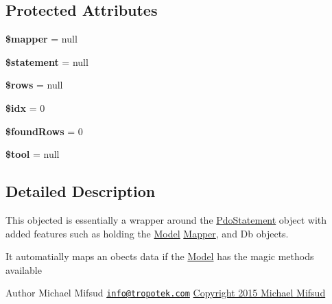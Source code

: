 \subsection*{Protected Attributes}
\begin{DoxyCompactItemize}
\item 
\hypertarget{classTk_1_1Db_1_1ArrayObject_af34f0e32e8e258554cee2574f05f71cd}{{\bfseries \$mapper} = null}\label{classTk_1_1Db_1_1ArrayObject_af34f0e32e8e258554cee2574f05f71cd}

\item 
\hypertarget{classTk_1_1Db_1_1ArrayObject_ae0e5c4143c950ee15d4d71a215089daa}{{\bfseries \$statement} = null}\label{classTk_1_1Db_1_1ArrayObject_ae0e5c4143c950ee15d4d71a215089daa}

\item 
\hypertarget{classTk_1_1Db_1_1ArrayObject_a053759767d3a0d795b9be97a520194dd}{{\bfseries \$rows} = null}\label{classTk_1_1Db_1_1ArrayObject_a053759767d3a0d795b9be97a520194dd}

\item 
\hypertarget{classTk_1_1Db_1_1ArrayObject_a6ea5aeca879078a9367ed16b81a91312}{{\bfseries \$idx} = 0}\label{classTk_1_1Db_1_1ArrayObject_a6ea5aeca879078a9367ed16b81a91312}

\item 
\hypertarget{classTk_1_1Db_1_1ArrayObject_a299522a9e2fc68d61957b4b42307c365}{{\bfseries \$found\+Rows} = 0}\label{classTk_1_1Db_1_1ArrayObject_a299522a9e2fc68d61957b4b42307c365}

\item 
\hypertarget{classTk_1_1Db_1_1ArrayObject_a6e532f879502d308524dcda1dc24516b}{{\bfseries \$tool} = null}\label{classTk_1_1Db_1_1ArrayObject_a6e532f879502d308524dcda1dc24516b}

\end{DoxyCompactItemize}


\subsection{Detailed Description}
This objected is essentially a wrapper around the \hyperlink{classTk_1_1Db_1_1PdoStatement}{Pdo\+Statement} object with added features such as holding the \hyperlink{classTk_1_1Db_1_1Model}{Model} \hyperlink{classTk_1_1Db_1_1Mapper}{Mapper}, and Db objects.

It automatially maps an obects data if the \hyperlink{classTk_1_1Db_1_1Model}{Model} has the magic methods available

\begin{DoxyAuthor}{Author}
Michael Mifsud \href{mailto:info@tropotek.com}{\tt info@tropotek.\+com} \hyperlink{}{Copyright 2015 Michael Mifsud }
\end{DoxyAuthor}


